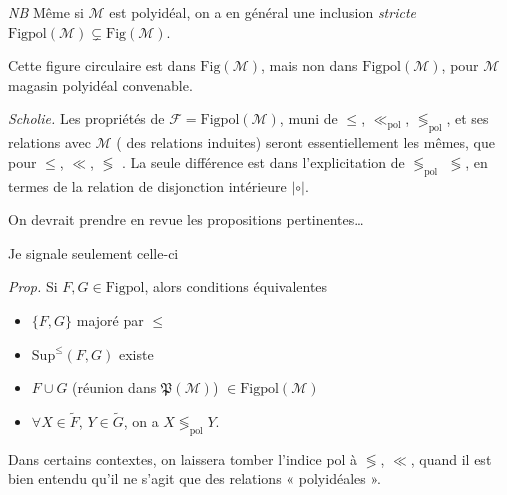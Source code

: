\documentclass[11pt,a4paper]{article}
\begin{document}

\emph{NB} Même si $\mathcal{M}$ est polyidéal, on a en général une inclusion
\emph{stricte} $\mathrm{Figpol}(\mathcal{M}) \subsetneq \mathrm{Fig}(\mathcal{M})$.

Cette figure circulaire est dans $\mathrm{Fig}(\mathcal{M})$, mais non dans
$\mathrm{Figpol}(\mathcal{M})$, pour $\mathcal{M}$ magasin polyidéal convenable.


\emph{Scholie.} Les propriétés   de
$\mathcal{F} = \mathrm{Figpol}(\mathcal{M})$, muni de $\leq$,
$\ll_{\mathrm{pol}}$, $\lessgtr_{\mathrm{pol}}$, et ses relations avec
$\mathcal{M}$ ( des relations induites) seront essentiellement
les mêmes, que pour $\leq$, $\ll$, $\lessgtr$ . La seule
différence est dans l'explicitation de $\lessgtr_{\mathrm{pol}}$
 $\lessgtr$, en termes de la relation de disjonction
intérieure $|\circ|$.

On devrait prendre en revue  les propositions pertinentes…

Je signale seulement celle-ci

\emph{Prop.} Si $F, G \in \mathrm{Figpol}$, alors  conditions équivalentes
\begin{itemize}
  \item[(i)] $\{F, G\}$ majoré par $\leq$
  \item[(ii)] $\mathrm{Sup}^{\leq}(F, G)$ existe
  \item[(ii')] $F \cup G$ (réunion dans $\mathfrak{P}(\mathcal{M})$) $\in \mathrm{Figpol}(\mathcal{M})$
  \item[(iii)] $\forall X \in \widetilde{F}$, $Y \in \widetilde{G}$, on a $X \lessgtr_{\mathrm{pol}} Y$.
\end{itemize}

Dans certains contextes, on laissera tomber l'indice pol à $\lessgtr$, $\ll$,
quand il est bien entendu qu'il ne s'agit que des relations « polyidéales ».
\end{document}
